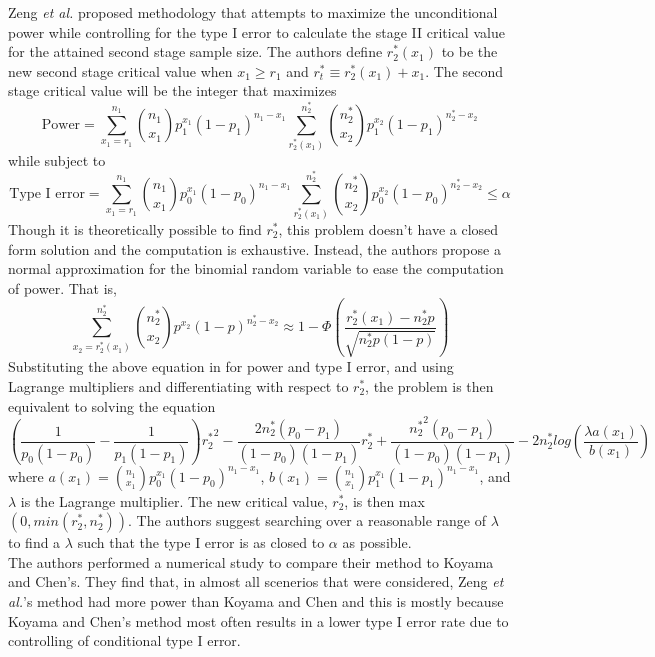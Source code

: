 \documentclass[12pt]{report}\usepackage[]{graphicx}\usepackage[]{color}
\newlength{\li}\setlength{\li}{14.48pt}
\newlength{\di}\setlength{\di}{-3.5mm}
\begin{document}
\indent Zeng \textit{et al.} \cite{Zeng} proposed methodology that attempts to maximize the unconditional power while controlling for the type I error to calculate the stage II critical value for the attained second stage sample size. The authors define $r_2^\ast(x_1)$ to be the new second stage critical value when $x_1 \geq r_1$ and $r_t^\ast \equiv r_2^\ast(x_1) + x_1$. The second stage critical value will be the integer that maximizes 
$$ \mbox{Power} = \sum_{x_1 = r_1}^{n_1} {n_1 \choose x_1} p_1^{x_1} (1-p_1)^{n_1 - x_1} \sum_{r_2^\ast(x_1)}^{n_2^\ast} {n_2^\ast \choose x_2} p_1^{x_2} (1-p_1)^{{n_2^\ast}-x_2}$$
while subject to 
$$ \mbox{Type I error} = \sum_{x_1 = r_1}^{n_1} {n_1 \choose x_1} p_0^{x_1} (1-p_0)^{n_1 - x_1} \sum_{r_2^\ast(x_1)}^{n_2^\ast} {n_2^\ast \choose x_2} p_0^{x_2}(1-p_0)^{{n_2^\ast}-x_2} \leq \alpha$$ Though it is theoretically possible to find $r_2^\ast$, this problem doesn't have a closed form solution and the computation is exhaustive. Instead, the authors propose a normal approximation for the binomial random variable to ease the computation of power. That is, 
$$ \sum_{x_2 = r_2^\ast(x_1)}^{n_2^\ast} {n_2^\ast \choose x_2} p^{x_2} (1-p)^{n_2^\ast - x_2} \approx 1-\Phi \left(\frac{r_2^\ast(x_1) - n_2^\ast p}{\sqrt{n_2^\ast p(1-p)}} \right)$$ 
Substituting the above equation in for power and type I error, and using Lagrange multipliers and differentiating with respect to $r_2^\ast$, the problem is then equivalent to solving the equation 
$$\left(\frac{1}{p_0(1-p_0)} - \frac{1}{p_1(1-p_1)} \right) {r_2^\ast}^2 - \frac{2 n_2^\ast (p_0 - p_1)}{(1-p_0)(1-p_1)}r_2^\ast + \frac{{n_2^\ast}^2(p_0-p_1)}{(1-p_0)(1-p_1)}-2n_2^\ast log \left(\frac{\lambda a(x_1)}{b(x_1)}\right)$$ 
where $a(x_1) = {n_1 \choose x_1} p_0^{x_1} (1-p_0)^{n_1-x_1}$, $b(x_1) = {n_1 \choose x_1} p_1^{x_1} (1-p_1)^{n_1-x_1}$, and $\lambda$ is the Lagrange multiplier. The new critical value, $r_2^\ast$, is then max$\left(0, min\left(r_2^\ast, n_2^\ast \right) \right)$. The authors suggest searching over a reasonable range of $\lambda$ to find a $\lambda$ such that the type I error is as closed to $\alpha$ as possible. \\

\indent The authors performed a numerical study to compare their method to Koyama and Chen's. They find that, in almost all scenerios that were considered, Zeng \textit{et al.}'s method had more power than Koyama and Chen and this is mostly because Koyama and Chen's method most often results in a lower type I error rate due to controlling of conditional type I error. 
\end{document}
